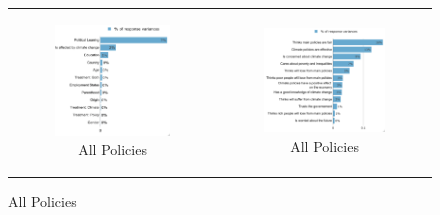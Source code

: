 \documentclass{article}
\begin{document}
\begin{figure}[h!]
\begin{center}
	\caption{Variance decomposition LMG}
	\setlength\extrarowheight{-1pt}
	\begin{tabular}{cc}
		\begin{subfigure}{0.5\textwidth}
		\caption{All Policies}
			\includegraphics[width=\textwidth]{lmg_all_policies_socio_non_standardized}
		\end{subfigure}&
		\begin{subfigure}{0.5\textwidth}
		\caption{All Policies}
			\includegraphics[width=\textwidth]{lmg_all_policies_indices_non_standardized}
		\end{subfigure}\\
	\end{tabular}


\end{center}
\end{figure}
\end{document}
